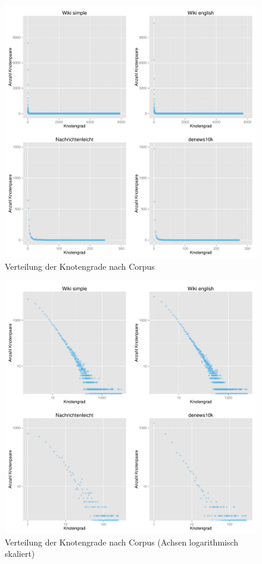 \documentclass[11pt, a4paper]{article}
\begin{document}
\begin{figure}[ht]
    \centering
        \includegraphics[scale=.5]{vdeg_plots.pdf}
        \caption{Verteilung der Knotengrade nach Corpus}
    \label{fig-vdeg}
\end{figure}

\begin{figure}[ht]
    \centering
        \includegraphics[scale=.5]{vdeg_plots_log.pdf}
        \caption{Verteilung der Knotengrade nach Corpus (Achsen logarithmisch skaliert)}
    \label{fig-vdeg-log}
\end{figure}
\end{document}
